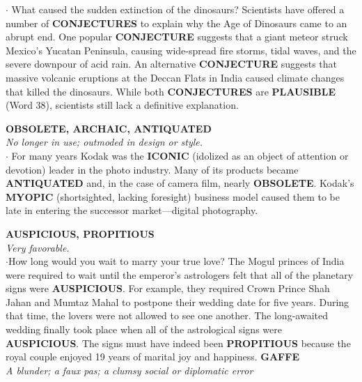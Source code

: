 \documentclass{exam}
\begin{document}
\begin{questions}
$\cdot$ What caused the sudden extinction of the dinosaurs? Scientists have offered a number of \textbf{CONJECTURES} to explain why the Age of Dinosaurs came to an abrupt end. One popular \textbf{CONJECTURE} suggests that a giant meteor struck Mexico's Yucatan Peninsula, causing wide-spread fire storms, tidal waves, and the severe downpour of acid rain. An alternative \textbf{CONJECTURE} suggests that massive volcanic eruptions at the Deccan Flats in India caused climate changes that killed the dinosaurs. While both \textbf{CONJECTURES} are \textbf{PLAUSIBLE} (Word 38), scientists still lack a definitive explanation. 

\question \textbf{OBSOLETE, ARCHAIC, ANTIQUATED} \\ \textit{No longer in use; outmoded in design or style.}\\

$\cdot$ For many years Kodak was the \textbf{ICONIC} (idolized as an object of attention or devotion) leader in the photo industry. Many of its products became \textbf{ANTIQUATED} and, in the case of camera film, nearly \textbf{OBSOLETE}. Kodak's \textbf{MYOPIC} (shortsighted, lacking foresight) business model caused them to be late in entering the successor market—digital photography.

\question \textbf{AUSPICIOUS, PROPITIOUS}\\
\textit{Very  favorable.}\\

$\cdot$How long would you wait to marry your true love? The Mogul princes of India were required to wait until the emperor's astrologers felt that all of the planetary signs were \textbf{AUSPICIOUS}. For example, they required Crown Prince Shah Jahan and Mumtaz Mahal to postpone their wedding date for five years. During that time, the lovers were not allowed to see one another. The long-awaited wedding finally took place when all of the astrological signs were \textbf{ AUSPICIOUS}. The signs must have indeed been \textbf{PROPITIOUS} because the royal couple enjoyed 19 years of marital joy and happiness.
\question  \textbf{GAFFE}\\ 
\textit{A blunder; a faux pas; a clumsy social or diplomatic error}\\


\end{questions}
\end{document}
